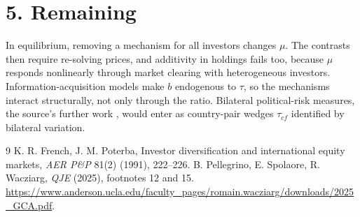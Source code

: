 \documentclass[11pt]{article}
\theoremstyle{definition}
\begin{document}
\section*{5. Remaining}
In equilibrium, removing a mechanism for all investors changes $\mu$. The contrasts then require re-solving prices, and
additivity in holdings fails too, because $\mu$ responds nonlinearly through market clearing with heterogeneous investors.
Information-acquisition models make $b$ endogenous to $\tau$, so the mechanisms interact structurally, not only through the
ratio. Bilateral political-risk measures, the source's further work \cite{psw}, would enter as country-pair wedges $\tau_{cf}$
identified by bilateral variation.

\begin{thebibliography}{9}
 K. R. French, J. M. Poterba, Investor diversification and international equity markets, \emph{AER P\&P} 81(2) (1991), 222--226.
 B. Pellegrino, E. Spolaore, R. Wacziarg, \emph{QJE} (2025), footnotes 12 and 15. \url{https://www.anderson.ucla.edu/faculty_pages/romain.wacziarg/downloads/2025_GCA.pdf}.
\end{thebibliography}
\end{document}
